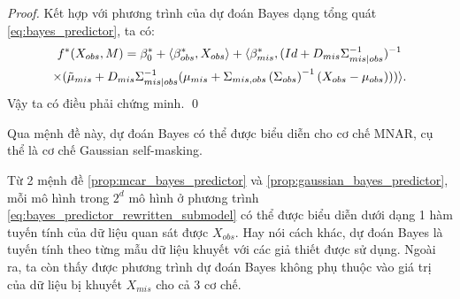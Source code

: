 \begin{proof}
    Kết hợp với phương trình của dự đoán Bayes dạng tổng quát \eqref{eq:bayes_predictor}, ta có:
    \begin{multline*}
        f^{*}(X_{obs}, M) = 
        \beta_{0}^{*} + \langle\beta_{obs}^{*}, X_{obs}\rangle 
        + \langle\beta_{mis}^{*},(Id + D_{mis} \Sigma_{mis|obs}^{-1})^{-1} \\
        \times (\tilde{\mu}_{mis} + D_{mis}\Sigma_{mis|obs}^{-1}(\mu_{mis} + 
        \Sigma_{mis,obs}\left(\Sigma_{obs}\right)^{-1} (X_{obs}-\mu_{obs}))) \rangle.
    \end{multline*}
    Vậy ta có điều phải chứng minh. \qed
\end{proof}

Qua mệnh đề này, dự đoán Bayes có thể được biểu diễn cho cơ chế MNAR, cụ thể là cơ chế Gaussian self-masking.

Từ 2 mệnh đề \ref{prop:mcar_bayes_predictor} và \ref{prop:gaussian_bayes_predictor}, 
mỗi mô hình trong $2^d$ mô hình ở phương trình \eqref{eq:bayes_predictor_rewritten_submodel} có thể được biểu diễn dưới dạng 1 hàm tuyến tính của dữ liệu quan sát được $X_{obs}$. Hay nói cách khác, dự đoán Bayes là tuyến tính theo từng mẫu dữ liệu khuyết với các giả thiết được sử dụng. Ngoài ra, ta còn thấy được phương trình dự đoán Bayes không phụ thuộc vào giá trị của dữ liệu bị khuyết $X_{mis}$ cho cả 3 cơ chế.